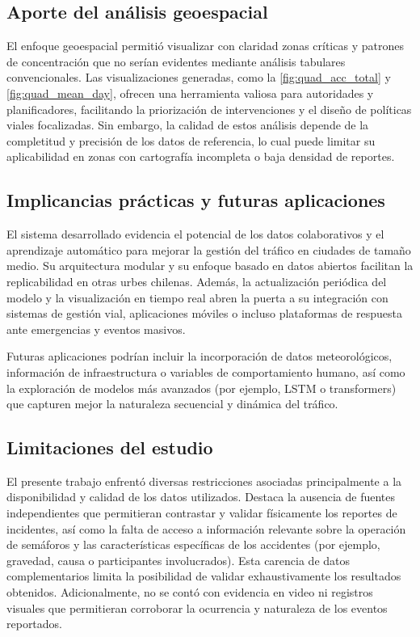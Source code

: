 \documentclass[12pt]{article}
\begin{document}
\subsection{Aporte del análisis geoespacial}

El enfoque geoespacial permitió visualizar con claridad zonas críticas y patrones de concentración que no serían evidentes mediante análisis tabulares convencionales. Las visualizaciones generadas, como la \cref{fig:quad_acc_total} y \cref{fig:quad_mean_day}, ofrecen una herramienta valiosa para autoridades y planificadores, facilitando la priorización de intervenciones y el diseño de políticas viales focalizadas. Sin embargo, la calidad de estos análisis depende de la completitud y precisión de los datos de referencia, lo cual puede limitar su aplicabilidad en zonas con cartografía incompleta o baja densidad de reportes.

\subsection{Implicancias prácticas y futuras aplicaciones}

El sistema desarrollado evidencia el potencial de los datos colaborativos y el aprendizaje automático para mejorar la gestión del tráfico en ciudades de tamaño medio. Su arquitectura modular y su enfoque basado en datos abiertos facilitan la replicabilidad en otras urbes chilenas. Además, la actualización periódica del modelo y la visualización en tiempo real abren la puerta a su integración con sistemas de gestión vial, aplicaciones móviles o incluso plataformas de respuesta ante emergencias y eventos masivos.

Futuras aplicaciones podrían incluir la incorporación de datos meteorológicos, información de infraestructura o variables de comportamiento humano, así como la exploración de modelos más avanzados (por ejemplo, LSTM o transformers) que capturen mejor la naturaleza secuencial y dinámica del tráfico.

\subsection{Limitaciones del estudio}

El presente trabajo enfrentó diversas restricciones asociadas principalmente a la disponibilidad y calidad de los datos utilizados. Destaca la ausencia de fuentes independientes que permitieran contrastar y validar físicamente los reportes de incidentes, así como la falta de acceso a información relevante sobre la operación de semáforos y las características específicas de los accidentes (por ejemplo, gravedad, causa o participantes involucrados). Esta carencia de datos complementarios limita la posibilidad de validar exhaustivamente los resultados obtenidos. Adicionalmente, no se contó con evidencia en video ni registros visuales que permitieran corroborar la ocurrencia y naturaleza de los eventos reportados.
\end{document}
